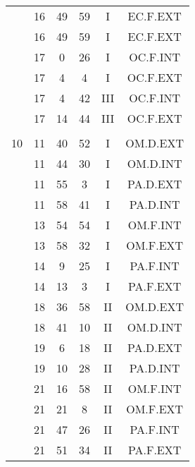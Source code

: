 \documentclass[12pt, a4paper]{article}
\begin{document}
\begin{multicols}{3}
{\begin{tabular}{c c c c c c}
	 	 	 	 & 16 & 49 & 59 & I & EC.F.EXT\\%
	 	 	 	 & 16 & 49 & 59 & I & EC.F.EXT\\%
	 	 	 	 & 17 & 0 & 26 & I & OC.F.INT\\%
	 	 	 	 & 17 & 4 & 4 & I & OC.F.EXT\\%
	 	 	 	 & 17 & 4 & 42 & III & OC.F.INT\\%
	 	 	 	 & 17 & 14 & 44 & III & OC.F.EXT\\%
	 	 	 	 & & & & & \\%
	 	 	 	10 & 11 & 40 & 52 & I & OM.D.EXT\\%
	 	 	 	 & 11 & 44 & 30 & I & OM.D.INT\\%
	 	 	 	 & 11 & 55 & 3 & I & PA.D.EXT\\%
	 	 	 	 & 11 & 58 & 41 & I & PA.D.INT\\%
	 	 	 	 & 13 & 54 & 54 & I & OM.F.INT\\%
	 	 	 	 & 13 & 58 & 32 & I & OM.F.EXT\\%
	 	 	 	 & 14 & 9 & 25 & I & PA.F.INT\\%
	 	 	 	 & 14 & 13 & 3 & I & PA.F.EXT\\%
	 	 	 	 & 18 & 36 & 58 & II & OM.D.EXT\\%
	 	 	 	 & 18 & 41 & 10 & II & OM.D.INT\\%
	 	 	 	 & 19 & 6 & 18 & II & PA.D.EXT\\%
	 	 	 	 & 19 & 10 & 28 & II & PA.D.INT\\%
	 	 	 	 & 21 & 16 & 58 & II & OM.F.INT\\%
	 	 	 	 & 21 & 21 & 8 & II & OM.F.EXT\\%
	 	 	 	 & 21 & 47 & 26 & II & PA.F.INT\\%
	 	 	 	 & 21 & 51 & 34 & II & PA.F.EXT\\%

\end{tabular}}
\end{multicols}
\end{document}
